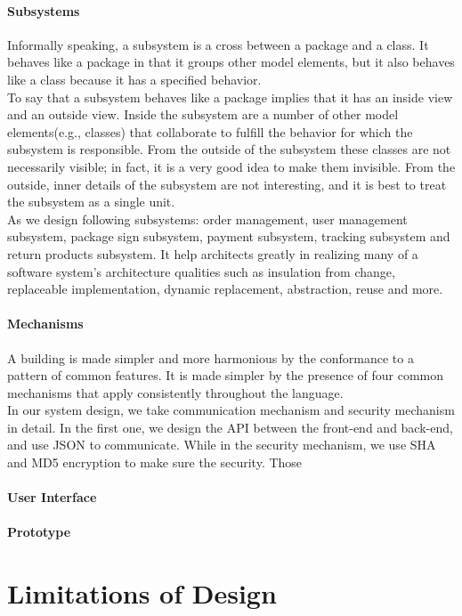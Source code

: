 \documentclass[12pt]{scrreprt}
\begin{document}
\subsubsection{Subsystems}
Informally speaking, a subsystem is a cross between a package and a class. It behaves like a package in that it groups other model elements, but it also behaves like a class because it has a specified behavior.\\
To say that a subsystem behaves like a package implies that it has an inside view and an outside view. Inside the subsystem are a number of other model elements(e.g., classes) that collaborate to fulfill the behavior for which the subsystem is responsible. From the outside of the subsystem these classes are not necessarily visible; in fact, it is a very good idea to make them invisible. From the outside, inner details of the subsystem are not interesting, and it is best to treat the subsystem as a single unit.\\
As we design following subsystems: order management, user management subsystem, package sign subsystem, payment subsystem, tracking subsystem and return products subsystem. It help architects greatly in realizing many of a software system's architecture qualities such as insulation from change, replaceable implementation, dynamic replacement, abstraction, reuse and more.
\subsubsection{Mechanisms}
A building is made simpler and more harmonious by the conformance to a pattern of common features. It is made simpler by the presence of four common mechanisms that apply consistently throughout the language.\\
In our system design, we take communication mechanism and security mechanism in detail. In the first one, we design the API between the front-end and back-end, and use JSON to communicate. While in the security mechanism, we use SHA and MD5 encryption to make sure the security. Those 


\subsubsection{User Interface}

\subsubsection{Prototype}

\chapter{Limitations of Design}
\end{document}
